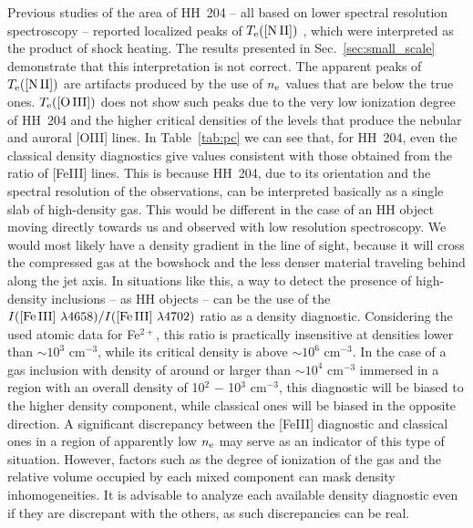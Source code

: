 \documentclass[twocolumn]{aastex63}
\newcommand{\eduardo}[1]{{\color{teal}E: #1}}
\begin{document}
Previous studies of the area of HH~204 -- all based on lower spectral resolution spectroscopy -- reported localized peaks of $T_{\rm e}(\text{[N\thinspace II]})$ \citep{mesadelgado08,nunezdiaz12,odell17}, which were interpreted as the product of shock heating. 
The results presented in  Sec.~\ref{sec:small_scale} demonstrate that this interpretation is not correct. 
The apparent peaks of $T_{\rm e}(\text{[N\thinspace II]})$ are artifacts produced by the use of $n_{\rm e}$ values that are below the true ones.
$T_{\rm e}(\text{[O\thinspace III]})$ does not show such peaks due to the very low ionization degree of HH~204 and the higher critical densities of the levels that produce the nebular and auroral [O\thinspace III] lines. 
In Table~\ref{tab:pc} we can see that, for HH~204, even the classical density diagnostics give values consistent with those obtained from the ratio of [Fe\thinspace III] lines. This is because HH~204, due to its orientation and the spectral resolution of the observations, can be interpreted basically as a single slab of high-density gas. This would be different in the case of an HH object moving directly towards us and observed with low resolution spectroscopy. We would most likely have a density gradient in the line of sight, because it will cross the compressed gas at the bowshock and the less denser material traveling behind along the jet axis. In situations like this, a way to detect the presence of high-density inclusions -- as HH objects -- can be the use of the $I(\text{[Fe\thinspace III] } \lambda 4658)/I(\text{[Fe\thinspace III] } \lambda 4702)$ ratio as a density diagnostic. Considering the used atomic data for Fe$^{2+}$, this ratio is practically  insensitive at densities lower than $\sim 10^3 \text{ cm}^{-3}$, while its critical density is above $\sim 10^6 \text{ cm}^{-3}$. In the case of a gas inclusion with density of around or larger than $\sim 10^4 \text{ cm}^{-3}$ immersed in a region with an overall density of 10$^2$ $-$ 10$^3$ cm$^{-3}$, this diagnostic will be biased to the higher density component, while classical ones will be biased in the opposite direction. A significant discrepancy between the [Fe\thinspace III] diagnostic and classical ones in a region of apparently low $n_{\rm e}$ may serve as an indicator of this type of situation. However, factors such as the degree of ionization of the gas and the relative volume occupied by each mixed component can mask density inhomogeneities. It is advisable to analyze each available density diagnostic even if they are discrepant with the others, as such discrepancies can be real.   
\end{document}
